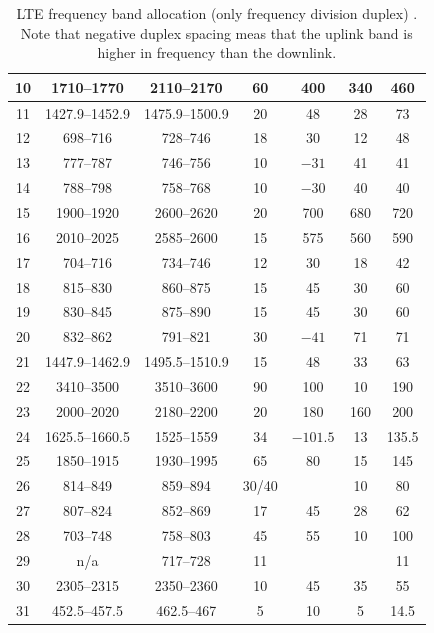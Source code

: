 \begin{table}[htbp]
\begin{tabular}{|c|c|c|c|c|c|c|}
    10 & 1710--1770 & 2110--2170 & 60 & 400  & 340  & 460\\ \hline
    11 & 1427.9--1452.9 & 1475.9--1500.9 & 20 & 48  & 28  & 73\\ \hline
    12 & 698--716   & 728--746   & 18 & 30  & 12  & 48\\ \hline
    13 & 777--787   & 746--756   & 10 & $-31$  & 41  & 41\\ \hline
    14 & 788--798   & 758--768   & 10 & $-30$  & 40  & 40\\ \hline
    15 & 1900--1920 & 2600--2620 & 20 & 700  & 680  & 720\\ \hline
    16 & 2010--2025 & 2585--2600 & 15 & 575 & 560 & 590\\ \hline
    17 & 704--716   & 734--746   & 12 & 30  & 18  & 42\\ \hline
    18 & 815--830   & 860--875   & 15 & 45  & 30  & 60\\ \hline
    19 & 830--845   & 875--890   & 15 & 45  & 30  & 60\\ \hline
    20 & 832--862   & 791--821   & 30 & $-41$  & 71  & 71\\ \hline
    21 & 1447.9--1462.9 & 1495.5--1510.9 & 15 & 48  & 33  & 63\\ \hline
    22 & 3410--3500 & 3510--3600 & 90 & 100  & 10  & 190\\ \hline
    23 & 2000--2020 & 2180--2200 & 20 & 180  & 160  & 200\\ \hline
    24 & 1625.5--1660.5 & 1525--1559 & 34 & $-101.5$  & 13  & 135.5\\ \hline
    25 & 1850--1915 & 1930--1995 & 65 & 80  & 15  & 145\\ \hline
    26 & 814--849   & 859--894   & 30/40 &     & 10  & 80\\ \hline
    27 & 807--824   & 852--869   & 17 & 45  & 28  & 62\\ \hline
    28 & 703--748   & 758--803   & 45 & 55  & 10  & 100\\ \hline
    29 & n/a         & 717--728   & 11 &     &     & 11\\ \hline
    30 & 2305--2315 & 2350--2360 & 10 & 45  & 35  & 55\\ \hline
    31 & 452.5--457.5 & 462.5--467 & 5  & 10  & 5   & 14.5\\ \hline
  \end{tabular}
  \caption{LTE frequency band allocation (only frequency division duplex) \cite{radio2015electronics}. Note that negative duplex spacing meas that the uplink band is higher in frequency than the downlink.}
  \label{tab:ltefreqband}
\end{table}

